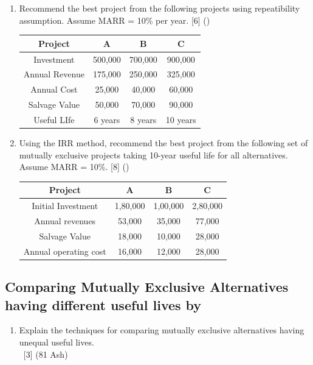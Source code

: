 \documentclass[12pt]{article}
\newcommand{\enter}{\\\textcolor{white}{1}}
\begin{document}
\begin{enumerate}[noitemsep, topsep=0pt]
		\item Recommend the best project from the following projects using repeatibility assumption. Assume MARR = 10\% per year. \hfill [6] ()\\
		\begin{tabular}{|c|c|c|c|}
			\hline
			Project & A & B & C \\ \hline
			Investment & 500,000 & 700,000 & 900,000 \\ \hline
			Annual Revenue & 175,000 & 250,000 & 325,000 \\ \hline
			Annual Cost & 25,000 & 40,000 & 60,000 \\ \hline
			Salvage Value & 50,000 & 70,000 & 90,000 \\ \hline
			Useful LIfe & 6 years & 8 years & 10 years \\ \hline
		\end{tabular}
		
		\item Using the IRR method, recommend the best project from the following set of mutually exclusive projects taking 10-year useful life for all alternatives. Assume MARR = 10\%. \hfill [8] ()\\
		\begin{tabular}{|c|c|c|c|}
			\hline
			Project & A & B & C \\ \hline
			Initial Investment & 1,80,000 & 1,00,000 & 2,80,000 \\ \hline
			Annual revenues & 53,000 & 35,000 & 77,000 \\ \hline
			Salvage Value & 18,000 & 10,000 & 28,000 \\ \hline
			Annual operating cost & 16,000 & 12,000 & 28,000 \\ \hline
		\end{tabular}
	\end{enumerate}
	\subsection{Comparing Mutually Exclusive Alternatives having different useful lives by}
	\begin{enumerate}[noitemsep, topsep = 0pt]
		\item Explain the techniques for comparing mutually exclusive alternatives having unequal useful lives. 
		\enter\hfill [3] (81 Ash)
	\end{enumerate}
\end{document}
